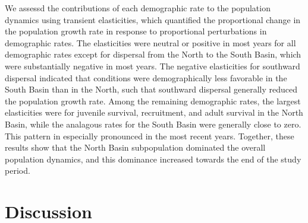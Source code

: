 \documentclass[11pt]{article}
\begin{document}
We assessd the contributions of each demographic rate to the population dynamics
using transient elasticities,
which quantified the proportional change in the population growth rate in 
response to proportional perturbations in demographic rates.
The elasticities were neutral or positive in most years for all demographic rates 
except for dispersal from the North to the South Basin,
which were substantially negative in most years.
The negative elasticities for southward dispersal indicated that conditions were 
demographically less favorable in the South Basin than in the North,
such that southward dispersal generally reduced the population growth rate.
Among the remaining demographic rates,
the largest elasticities were for juvenile survival, recruitment, and adult survival
in the North Basin, while the analagous rates for the South Basin were generally close to zero.
This pattern in especially pronounced in the most recent years.
Together, these results show that the North Basin subpopulation dominated 
the overall population dynamics, 
and this dominance increased towards the end of the study period.








\section*{Discussion}








\clearpage


\end{document}
